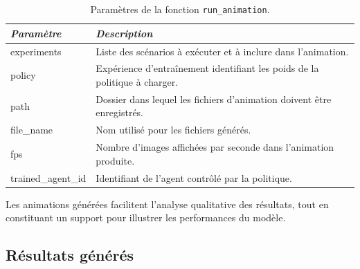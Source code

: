 \begin{table}[h]
    \centering
    \caption{Paramètres de la fonction \texttt{run\_animation}.}
    \label{tab:run_animation_parameters}
    \begin{tabularx}{\textwidth}{>{\ttfamily\small}l  X}
        \toprule
        \textnormal{\textit{Paramètre}} &
        \textit{Description}                                                                                         \\
        \midrule

        experiments

                                        & Liste des scénarios à exécuter et à inclure dans l'animation.              \\

        policy

                                        & Expérience d'entraînement identifiant les poids de la politique à charger. \\

        path

                                        & Dossier dans lequel les fichiers d'animation doivent être enregistrés.     \\

        file\_name

                                        & Nom utilisé pour les fichiers générés.                                     \\

        fps

                                        & Nombre d'images affichées par seconde dans l'animation produite.           \\

        trained\_agent\_id

                                        & Identifiant de l'agent contrôlé par la politique.                          \\

        \bottomrule
    \end{tabularx}
\end{table}

\noindent Les animations générées facilitent l'analyse qualitative des résultats, tout en constituant un support pour illustrer les performances du modèle.

\subsection{Résultats générés}

